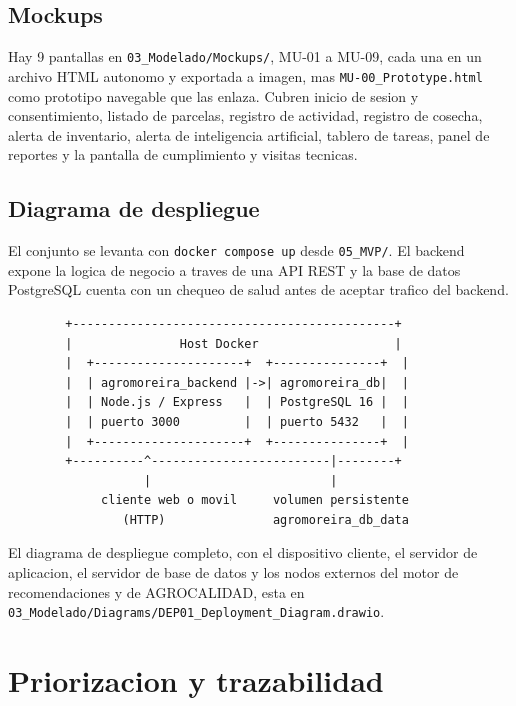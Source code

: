 \documentclass[11pt,a4paper]{article}
\newcommand{\ruta}[1]{\texttt{#1}}
\begin{document}
\subsection{Mockups}

Hay 9 pantallas en \ruta{03\_Modelado/Mockups/}, MU-01 a MU-09, cada una en un archivo HTML autonomo y exportada a imagen, mas \texttt{MU-00\_Prototype.html} como prototipo navegable que las enlaza. Cubren inicio de sesion y consentimiento, listado de parcelas, registro de actividad, registro de cosecha, alerta de inventario, alerta de inteligencia artificial, tablero de tareas, panel de reportes y la pantalla de cumplimiento y visitas tecnicas.

\subsection{Diagrama de despliegue}

El conjunto se levanta con \texttt{docker compose up} desde \ruta{05\_MVP/}. El backend expone la logica de negocio a traves de una API REST y la base de datos PostgreSQL cuenta con un chequeo de salud antes de aceptar trafico del backend.

\begin{verbatim}
        +---------------------------------------------+
        |               Host Docker                   |
        |  +---------------------+  +---------------+  |
        |  | agromoreira_backend |->| agromoreira_db|  |
        |  | Node.js / Express   |  | PostgreSQL 16 |  |
        |  | puerto 3000         |  | puerto 5432   |  |
        |  +---------------------+  +---------------+  |
        +----------^-------------------------|--------+
                   |                         |
             cliente web o movil     volumen persistente
                (HTTP)               agromoreira_db_data
\end{verbatim}

El diagrama de despliegue completo, con el dispositivo cliente, el servidor de aplicacion, el servidor de base de datos y los nodos externos del motor de recomendaciones y de AGROCALIDAD, esta en \ruta{03\_Modelado/Diagrams/DEP01\_Deployment\_Diagram.drawio}.

\section{Priorizacion y trazabilidad}
\end{document}
